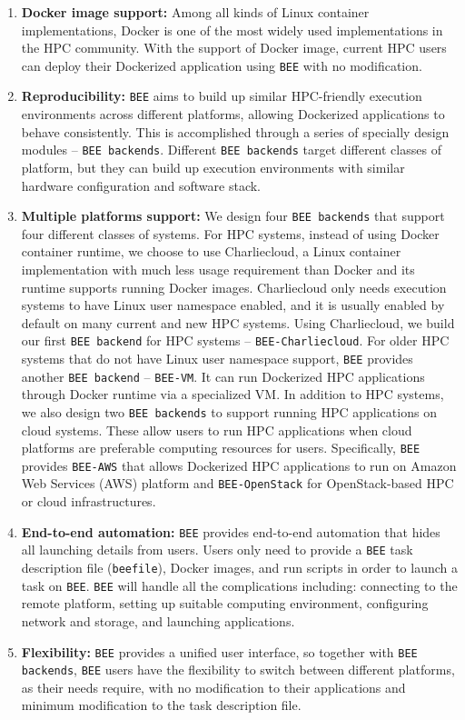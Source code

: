 \begin{enumerate}
\item \textbf{Docker image support:} Among all kinds of Linux container implementations, Docker is one of the most widely used implementations in the HPC community. With the support of Docker image, current HPC users can deploy their Dockerized application using \texttt{BEE} with no modification.
\item \textbf{Reproducibility:}
\texttt{BEE} aims to build up similar HPC-friendly execution environments across different platforms, allowing Dockerized applications to behave consistently. This is accomplished through a series of specially design modules -- \texttt{BEE backends}. Different \texttt{BEE backends} target different classes of platform, but they can build up execution environments with similar hardware configuration and software stack.
\item \textbf{Multiple platforms support:}
We design four \texttt{BEE backends} that support four different classes of systems. For HPC systems, instead of using Docker container runtime, we choose to use Charliecloud, a Linux container implementation with much less usage requirement than Docker and its runtime supports running Docker images. Charliecloud only needs execution systems to have Linux user namespace enabled, and it is usually enabled by default on many current and new HPC systems. Using Charliecloud, we build our first \texttt{BEE backend} for HPC systems -- \texttt{BEE-Charliecloud}. For older HPC systems that do not have Linux user namespace support, \texttt{BEE} provides another \texttt{BEE backend} -- \texttt{BEE-VM}. It can run Dockerized HPC applications through Docker runtime via a specialized VM. In addition to HPC systems, we also design two \texttt{BEE backends} to support running HPC applications on cloud systems. These allow users to run HPC applications when cloud platforms are preferable computing resources for users. Specifically, \texttt{BEE} provides \texttt{BEE-AWS} that allows Dockerized HPC applications to run on Amazon Web Services (AWS) platform and \texttt{BEE-OpenStack} for OpenStack-based HPC or cloud infrastructures. 
\item \textbf{End-to-end automation:}
\texttt{BEE} provides end-to-end automation that hides all launching details from users. Users only need to provide a \texttt{BEE} task description file (\texttt{beefile}), Docker images, and run scripts in order to launch a task on \texttt{BEE}. \texttt{BEE} will handle all the complications including: connecting to the remote platform, setting up suitable computing environment, configuring network and storage, and launching applications.
\item \textbf{Flexibility:}
\texttt{BEE} provides a unified user interface, so together with \texttt{BEE backends}, \texttt{BEE} users have the flexibility to switch between different platforms, as their needs require, with no modification to their applications and minimum modification to the task description file.
\end{enumerate}


